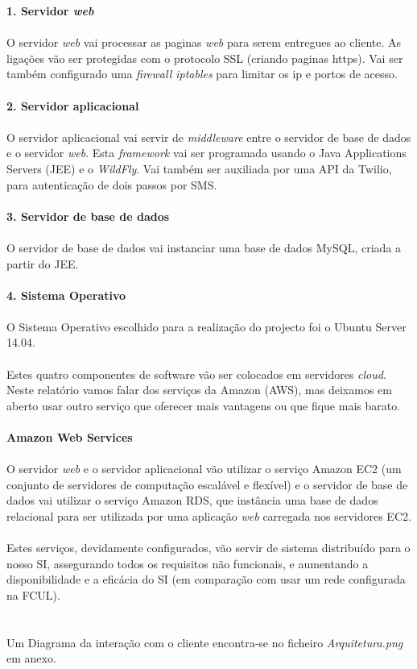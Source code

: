 \documentclass[12pt, a4paper, twoside]{report} %
\begin{document}
\noindent\textbf{1. Servidor \textit{web}}
\\
\\
O servidor \textit{web} vai processar as paginas \textit{web} para serem entregues ao cliente. As ligações vão ser protegidas com o protocolo SSL (criando paginas https). Vai ser também configurado uma \textit{firewall iptables} para limitar os ip e portos de acesso.
\\
\\
\noindent\textbf{2. Servidor aplicacional}
\\
\\
O servidor aplicacional vai servir de \textit{middleware} entre o servidor de base de dados e o servidor \textit{web}. Esta \textit{framework} vai ser programada usando o Java Applications Servers (JEE) e o \textit{WildFly}. Vai também ser auxiliada por uma API da Twilio, para autenticação de dois passos por SMS.
\\
\\
\noindent\textbf{3. Servidor de base de dados}
\\
\\
O servidor de base de dados vai instanciar uma base de dados MySQL, criada a partir do JEE.
\\
\\
\noindent\textbf{4. Sistema Operativo}
\\
\\
O Sistema Operativo escolhido para a realização do projecto foi o Ubuntu Server 14.04.
\\
\\
Estes quatro componentes de software vão ser colocados em servidores \textit{cloud}. Neste relatório vamos falar dos serviços da Amazon (AWS), mas deixamos em aberto usar outro serviço que oferecer mais vantagens ou que fique mais barato. 
\\
\\
\noindent\textbf{Amazon Web Services}
\\
\\
O servidor \textit{web} e o servidor aplicacional vão utilizar o serviço Amazon EC2 (um conjunto de servidores de computação escalável e flexível) e o servidor de base de dados vai utilizar o serviço Amazon RDS, que instância uma base de dados relacional para ser utilizada por uma aplicação \textit{web} carregada nos servidores EC2.
\\
\\
Estes serviços, devidamente configurados, vão servir de sistema distribuído para o nosso SI, assegurando todos os requisitos não funcionais, e aumentando a disponibilidade e a eficácia do SI (em comparação com usar um rede configurada na FCUL).
\\
\\
\\
Um Diagrama da interação com o cliente encontra-se no ficheiro \textit{Arquitetura.png} em anexo.
\end{document}
